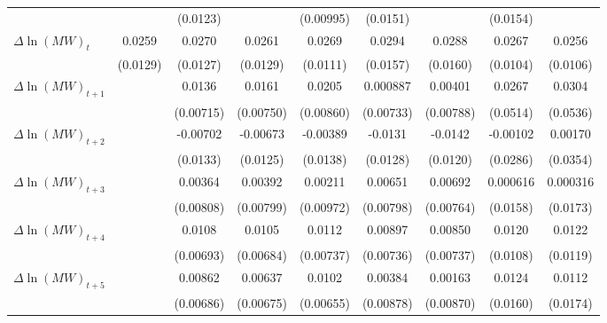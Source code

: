 {\begin{tabular}{l*{8}{c}}
          &                  & (0.0123)         &                  &(0.00995)         & (0.0151)         &                  & (0.0154)         &                  \\
[1em]
$\Delta \ln(MW)_{t}$&   0.0259\sym{*}  &   0.0270\sym{**} &   0.0261\sym{*}  &   0.0269\sym{**} &   0.0294\sym{*}  &   0.0288\sym{*}  &   0.0267\sym{**} &   0.0256\sym{**} \\
          & (0.0129)         & (0.0127)         & (0.0129)         & (0.0111)         & (0.0157)         & (0.0160)         & (0.0104)         & (0.0106)         \\
[1em]
$\Delta \ln(MW)_{t+1}$&                  &   0.0136\sym{*}  &   0.0161\sym{**} &   0.0205\sym{**} & 0.000887         &  0.00401         &   0.0267         &   0.0304         \\
          &                  &(0.00715)         &(0.00750)         &(0.00860)         &(0.00733)         &(0.00788)         & (0.0514)         & (0.0536)         \\
[1em]
$\Delta \ln(MW)_{t+2}$&                  & -0.00702         & -0.00673         & -0.00389         &  -0.0131         &  -0.0142         & -0.00102         &  0.00170         \\
          &                  & (0.0133)         & (0.0125)         & (0.0138)         & (0.0128)         & (0.0120)         & (0.0286)         & (0.0354)         \\
[1em]
$\Delta \ln(MW)_{t+3}$&                  &  0.00364         &  0.00392         &  0.00211         &  0.00651         &  0.00692         & 0.000616         & 0.000316         \\
          &                  &(0.00808)         &(0.00799)         &(0.00972)         &(0.00798)         &(0.00764)         & (0.0158)         & (0.0173)         \\
[1em]
$\Delta \ln(MW)_{t+4}$&                  &   0.0108         &   0.0105         &   0.0112         &  0.00897         &  0.00850         &   0.0120         &   0.0122         \\
          &                  &(0.00693)         &(0.00684)         &(0.00737)         &(0.00736)         &(0.00737)         & (0.0108)         & (0.0119)         \\
[1em]
$\Delta \ln(MW)_{t+5}$&                  &  0.00862         &  0.00637         &   0.0102         &  0.00384         &  0.00163         &   0.0124         &   0.0112         \\
          &                  &(0.00686)         &(0.00675)         &(0.00655)         &(0.00878)         &(0.00870)         & (0.0160)         & (0.0174)         \\

\end{tabular}}
